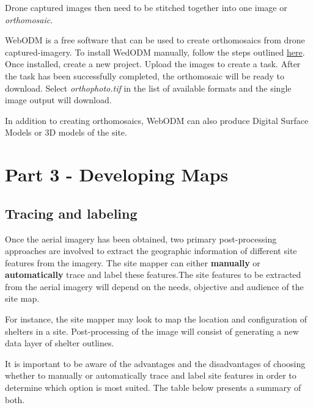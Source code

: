 \documentclass[
  a4paper,
  onecolumn,
  oneside]{book}
\begin{document}
Drone captured images then need to be stitched together into one image
or \emph{orthomosaic}.

WebODM is a free software that can be used to create orthomosaics from
drone captured-imagery. To install WedODM manually, follow the steps
outlined
\href{https://github.com/OpenDroneMap/WebODM/\#getting-started}{here}.
Once installed, create a new project. Upload the images to create a
task. After the task has been successfully completed, the orthomosaic
will be ready to download. Select \emph{orthophoto.tif} in the list of
available formats and the single image output will download.

In addition to creating orthomosaics, WebODM can also produce Digital
Surface Models or 3D models of the site.

\part{Part 3 - Developing Maps}

\hypertarget{tracing-and-labeling}{%
\chapter{Tracing and labeling}\label{tracing-and-labeling}}

Once the aerial imagery has been obtained, two primary post-processing
approaches are involved to extract the geographic information of
different site features from the imagery. The site mapper can either
\textbf{manually} or \textbf{automatically} trace and label these
features.The site features to be extracted from the aerial imagery will
depend on the needs, objective and audience of the site map.

For instance, the site mapper may look to map the location and
configuration of shelters in a site. Post-processing of the image will
consist of generating a new data layer of shelter outlines.

It is important to be aware of the advantages and the disadvantages of
choosing whether to manually or automatically trace and label site
features in order to determine which option is most suited. The table
below presents a summary of both.
\end{document}

